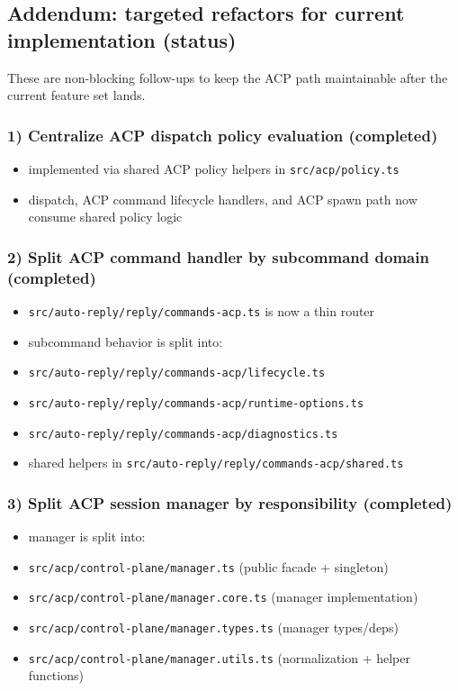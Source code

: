 \subsection{Addendum: targeted refactors for current implementation (status)}


These are non-blocking follow-ups to keep the ACP path maintainable after the current feature set lands.

\subsubsection{1) Centralize ACP dispatch policy evaluation (completed)}


\begin{itemize}
  \item implemented via shared ACP policy helpers in \texttt{src/acp/policy.ts}
  \item dispatch, ACP command lifecycle handlers, and ACP spawn path now consume shared policy logic
\end{itemize}


\subsubsection{2) Split ACP command handler by subcommand domain (completed)}


\begin{itemize}
  \item \texttt{src/auto-reply/reply/commands-acp.ts} is now a thin router
  \item subcommand behavior is split into:
  \item \texttt{src/auto-reply/reply/commands-acp/lifecycle.ts}
  \item \texttt{src/auto-reply/reply/commands-acp/runtime-options.ts}
  \item \texttt{src/auto-reply/reply/commands-acp/diagnostics.ts}
  \item shared helpers in \texttt{src/auto-reply/reply/commands-acp/shared.ts}
\end{itemize}


\subsubsection{3) Split ACP session manager by responsibility (completed)}


\begin{itemize}
  \item manager is split into:
  \item \texttt{src/acp/control-plane/manager.ts} (public facade + singleton)
  \item \texttt{src/acp/control-plane/manager.core.ts} (manager implementation)
  \item \texttt{src/acp/control-plane/manager.types.ts} (manager types/deps)
  \item \texttt{src/acp/control-plane/manager.utils.ts} (normalization + helper functions)
\end{itemize}


